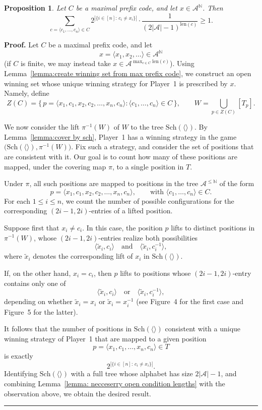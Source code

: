 \documentclass[a4,12pt]{article}%
\newtheorem{proposition}[theorem]{Proposition}
\newenvironment{proof}[1][Proof]{\textbf{#1.} }{\ \rule{0.5em}{0.5em}}
\newcommand{\N}{\mathbb{N}}
\begin{document}
\begin{proposition} \label{Theorem: Kraft like inequality with coverings}
Let $C$ be a maximal prefix code, and let $x \in \mathcal{A}^{\N}$. Then
\[
\sum_{c = \langle c_1, \ldots, c_n \rangle \in C}
2^{|\{ i \in [n] : \, c_i \neq x_i \}|}
\cdot \frac{1}{(2|\mathcal{A}| - 1)^{\mathrm{len}(c)}} \geq 1.
\]
\end{proposition}
\begin{proof} 
Let $C$ be a maximal prefix code, and let 
\[
x=\langle x_1,x_2,\ldots\rangle \in \mathcal{A}^{\mathbb{N}}
\]
(if $C$ is finite, we may instead take $x\in \mathcal{A}^{\max_{c\in C}\mathrm{len}(c)}$). Using Lemma~\ref{lemma:create winning set from max prefix code}, we construct an open winning set whose unique winning strategy for Player~1 is prescribed by $x$. Namely, define
\[
Z(C)=\bigl\{\, p=\langle x_1,c_1,x_2,c_2,\ldots,x_n,c_n\rangle : \langle c_1,\ldots,c_n\rangle\in C \,\bigr\},
\qquad 
W=\bigcup_{p\in Z(C)} [T_p].
\]

We now consider the lift $\pi^{-1}(W)$ of $W$ to the tree $\mathrm{Sch}(\langle\rangle)$. By Lemma~\ref{lemma:cover by sch}, Player~1 has a winning strategy in the game $\bigl(\mathrm{Sch}(\langle\rangle),\pi^{-1}(W)\bigr)$. Fix such a strategy, and consider the set of positions that are consistent with it. Our goal is to count how many of these positions are mapped, under the covering map $\pi$, to a single position in $T$.

Under $\pi$, all such positions are mapped to positions in the tree $\mathcal{A}^{\le \N}$ of the form
\[
p=\langle x_1,c_1,x_2,c_2,\ldots,x_n,c_n\rangle,
\qquad
\text{with }\langle c_1,\ldots,c_n\rangle\in C.
\]
For each $1\le i\le n$, we count the number of possible configurations for the corresponding $(2i-1,2i)$-entries of a lifted position.

\medskip

Suppose first that $x_i\neq c_i$. In this case, the position $p$ lifts to distinct positions in $\pi^{-1}(W)$, whose $(2i-1,2i)$-entries realize both possibilities
\[
\langle \tilde{x}_i, c_i\rangle
\quad\text{and}\quad
\langle \tilde{x}_i, c_i^{-1}\rangle,
\]
where $\tilde{x}_i$ denotes the corresponding lift of $x_i$ in $\mathrm{Sch}(\langle\rangle)$.

If, on the other hand, $x_i=c_i$, then $p$ lifts to positions whose $(2i-1,2i)$-entry contains only one of
\[
\langle \tilde{x}_i, c_i\rangle
\quad\text{or}\quad
\langle \tilde{x}_i, c_i^{-1}\rangle,
\]
depending on whether $\tilde{x}_i=x_i$ or $\tilde{x}_i=x_i^{-1}$ (see Figure~4 for the first case and Figure~5 for the latter).


\medskip 

It follows that the number of positions in $\mathrm{Sch}(\langle \rangle)$ consistent with a unique winning strategy of Player~1 that are mapped to a given position
\[
p = \langle x_1, c_1, \ldots,x_n, c_{n} \rangle \in T
\]
is exactly
\[
2^{|\{ i \in [n] : \, c_i \neq x_i \}|}.
\]
Identifying $\mathrm{Sch}(\langle \rangle)$ with a full tree whose alphabet has size $2|\mathcal{A}|-1$, and combining Lemma~\ref{lemma: necceserry open condition lengths} with the observation above, we obtain the desired result.
\end{proof}
\end{document}
